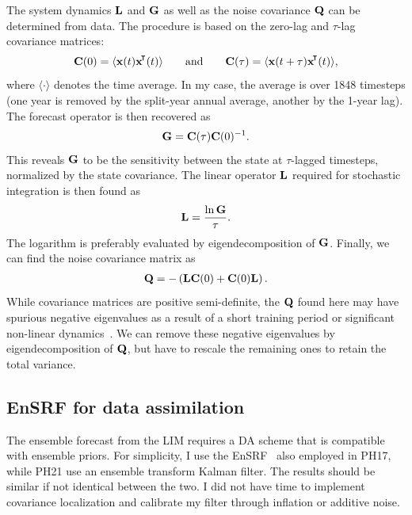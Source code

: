 \documentclass[parskip=half,DIV=16]{scrartcl}
\begin{document}
The system dynamics $\vb{L}$ and $\vb{G}$ as well as the noise covariance $\vb{Q}$ can be determined from data. The procedure is based on the zero-lag and $\tau$-lag covariance matrices:
\begin{align*}
    \vb{C}(0) = \langle \vb{x}(t) \vb{x}^\transpose*(t) \rangle \qquad \mathrm{and} \qquad \vb{C}(\tau) = \langle \vb{x}(t+\tau) \vb{x}^\transpose*(t) \rangle,
\end{align*}
where $\langle \cdot \rangle$ denotes the time average. In my case, the average is over 1848 timesteps (one year is removed by the split-year annual average, another by the 1-year lag). The forecast operator is then recovered as
\begin{align*}
    \vb{G} = \vb{C}(\tau) \vb{C}(0)^{-1}.
\end{align*}
This reveals $\vb{G}$ to be the sensitivity between the state at $\tau$-lagged timesteps, normalized by the state covariance. The linear operator $\vb{L}$ required for stochastic integration is then found as
\begin{align*}
    \vb{L} = \frac{\ln\vb{G}}{\tau}.
\end{align*}
The logarithm is preferably evaluated by eigendecomposition of $\vb{G}$. Finally, we can find the noise covariance matrix as
\begin{align*}
    \vb{Q} = - \left( \vb{L} \vb{C}(0) + \vb{C}(0) \vb{L} \right).
\end{align*}
While covariance matrices are positive semi-definite, the $\vb{Q}$ found here may have spurious negative eigenvalues as a result of a short training period or significant non-linear dynamics~\parencite{Penland1994}. We can remove these negative eigenvalues by eigendecomposition of $\vb{Q}$, but have to rescale the remaining ones to retain the total variance.



\subsection{EnSRF for data assimilation}
\label{subsec:setup-ensrf}

The ensemble forecast from the \gls{LIM} requires a \gls{DA} scheme that is compatible with ensemble priors. For simplicity, I use the \gls{EnSRF}~\parencite{Whitaker2002} also employed in PH17, while PH21 use an ensemble transform Kalman filter. The results should be similar if not identical between the two. I did not have time to implement covariance localization and calibrate my filter through inflation or additive noise.
\end{document}
